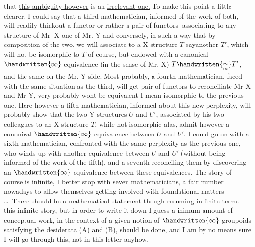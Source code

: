 
that \uline{this ambiguity however} is an \uline{irrelevant one.} To make this point a little clearer, I could say that a third mathematician, informed of the work of both, will readily thinkout a functor or rather a pair of functors, associating to any structure of Mr. X one of Mr. Y and conversely, in such a way that by composition of the two, we will associate to a X-structure \handwritten{(}$T$ say\handwritten{)}another $T'$, which  will not be isomorphic to $T$ of course, but endowed with a canonical  $\handwritten{\infty}$-equivalence (in the sense of Mr. X) $T\handwritten{\underset{\infty}{\simeq}}T'$, and the same on the Mr. Y side. Most probably, a fourth mathematician, faced with the same situation as the third, will get  pair of functors to reconciliate Mr X and Mr Y,  very probably  wont be equivalent  \handwritten{(}I mean isomorphic\handwritten{)} to the previous one. Here however a fifth mathematician, informed about this new perplexity, will probably show that the two Y-structures $U$ and $U'$, associated by his two colleagues to  an X-structure $T$, while not isomorphic alas, admit however a canonical $\handwritten{\infty}$-equivalence between $U$ and $U'$. I could go on with a sixth mathematician, confronted with the same perplexity as the previous one, who winds up with another \inserted{\handwritten{$\infty$}-}equivalence between $U$ and $U'$ (without being informed of the work of the fifth), and a seventh reconciling them by discovering an $\handwritten{\infty}$-equivalence between these equivalences. The story of course is infinite, I better stop with seven mathematicians, a fair number nowadays to allow themselves getting involved with foundational matters \ldots\ There should be a mathematical statement though resuming in finite terms this infinite story, but in order to write it down I guess a inimum amount of conceptual work, in the context of a given notion of $\handwritten{\infty}$-groupoids satisfying the desiderata (A) and (B), should be done, and I am by no means sure I will go through this, not in this letter anyhow.

